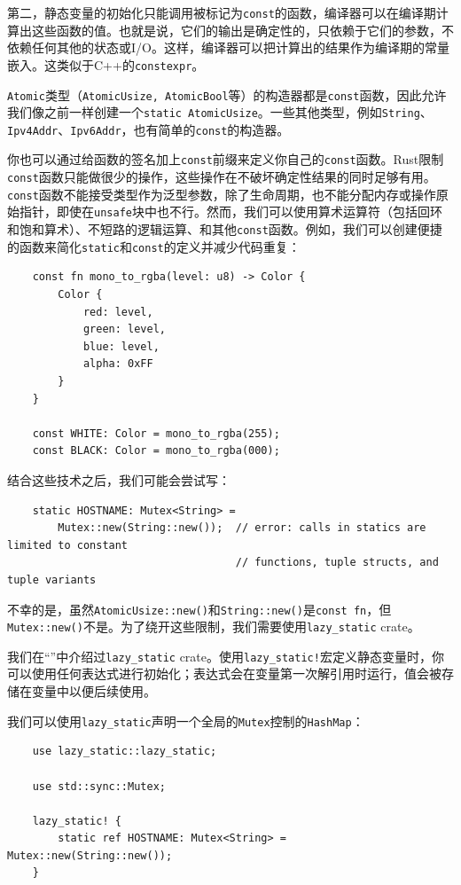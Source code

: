 第二，静态变量的初始化只能调用被标记为\texttt{const}的函数，编译器可以在编译期计算出这些函数的值。也就是说，它们的输出是确定性的，只依赖于它们的参数，不依赖任何其他的状态或I/O。这样，编译器可以把计算出的结果作为编译期的常量嵌入。这类似于C++的\texttt{constexpr}。

\texttt{Atomic}类型（\texttt{AtomicUsize, AtomicBool}等）的构造器都是\texttt{const}函数，因此允许我们像之前一样创建一个\texttt{static AtomicUsize}。一些其他类型，例如\texttt{String}、\texttt{Ipv4Addr}、\texttt{Ipv6Addr}，也有简单的\texttt{const}的构造器。

你也可以通过给函数的签名加上\texttt{const}前缀来定义你自己的\texttt{const}函数。Rust限制\texttt{const}函数只能做很少的操作，这些操作在不破坏确定性结果的同时足够有用。\texttt{const}函数不能接受类型作为泛型参数，除了生命周期，也不能分配内存或操作原始指针，即使在\texttt{unsafe}块中也不行。然而，我们可以使用算术运算符（包括回环和饱和算术）、不短路的逻辑运算、和其他\texttt{const}函数。例如，我们可以创建便捷的函数来简化\texttt{static}和\texttt{const}的定义并减少代码重复：
\begin{verbatim}
    const fn mono_to_rgba(level: u8) -> Color {
        Color {
            red: level,
            green: level,
            blue: level,
            alpha: 0xFF
        }
    }

    const WHITE: Color = mono_to_rgba(255);
    const BLACK: Color = mono_to_rgba(000);
\end{verbatim}

结合这些技术之后，我们可能会尝试写：
\begin{verbatim}
    static HOSTNAME: Mutex<String> =
        Mutex::new(String::new());  // error: calls in statics are limited to constant
                                    // functions, tuple structs, and tuple variants
\end{verbatim}

不幸的是，虽然\texttt{AtomicUsize::new()}和\texttt{String::new()}是\texttt{const fn}，但\texttt{Mutex::new()}不是。为了绕开这些限制，我们需要使用\texttt{lazy\_static} crate。

我们在“”中介绍过\texttt{lazy\_static} crate。使用\texttt{lazy\_static!}宏定义静态变量时，你可以使用任何表达式进行初始化；表达式会在变量第一次解引用时运行，值会被存储在变量中以便后续使用。

我们可以使用\texttt{lazy\_static}声明一个全局的\texttt{Mutex}控制的\texttt{HashMap}：
\begin{verbatim}
    use lazy_static::lazy_static;

    use std::sync::Mutex;

    lazy_static! {
        static ref HOSTNAME: Mutex<String> = Mutex::new(String::new());
    }
\end{verbatim}

